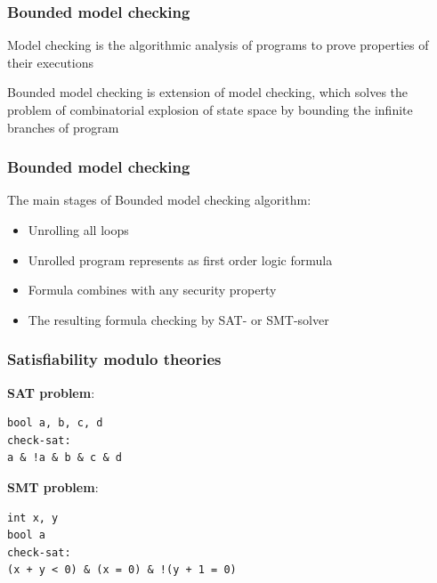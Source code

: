 \begin{frame}
	\frametitle{Bounded model checking}
	
	\begin{block}{}
	\centering
	Model checking is the algorithmic analysis of programs to prove properties
of their executions
	\end{block}
		
	\begin{block}{}
	\centering
	Bounded model checking is extension of model checking, which solves the problem of combinatorial explosion of state space by bounding the infinite branches of program
	\end{block}
		
\end{frame}


\begin{frame}
\frametitle{Bounded model checking}
The main stages of Bounded model checking algorithm:
	\begin{itemize}
		\item Unrolling all loops
		\item Unrolled program represents as first order logic formula
		\item Formula combines with any security property
		\item The resulting formula checking by SAT- or SMT-solver
	\end{itemize}
\end{frame}



\begin{frame}[fragile]
	\frametitle{Satisfiability modulo theories}
	
	\textbf{SAT problem}:
	\begin{lstlisting}[style=crs_cpp, basicstyle = {\ttfamily \scriptsize},]
bool a, b, c, d
check-sat:
a & !a & b & c & d
	\end{lstlisting}
	
	\textbf{SMT problem}:
	\begin{lstlisting}[style=crs_cpp, basicstyle = {\ttfamily \scriptsize},]
int x, y
bool a
check-sat:
(x + y < 0) & (x = 0) & !(y + 1 = 0)
	\end{lstlisting}
			
\end{frame}


